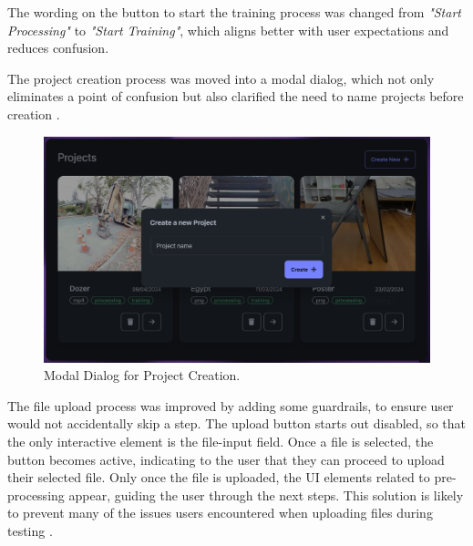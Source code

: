 The wording on the button to start the training process was changed from \emph{"Start Processing"} to \emph{"Start Training"}, which aligns better with user expectations and reduces confusion.


The project creation process was moved into a modal dialog, which not only eliminates a point of confusion but also clarified the need to name projects before creation .

\begin{figure}[htb]
  \centering
	\includegraphics[width=.8\textwidth]{figures/fix-3.png}
	\caption{Modal Dialog for Project Creation.}
  \label{fig:fix-3}
\end{figure}

The file upload process was improved by adding some guardrails, to ensure user would not accidentally skip a step.
The upload button starts out disabled, so that the only interactive element is the file-input field.
Once a file is selected, the button becomes active, indicating to the user that they can proceed to upload their selected file.
Only once the file is uploaded, the UI elements related to pre-processing appear, guiding the user through the next steps.
This solution is likely to prevent many of the issues users encountered when uploading files during testing .


